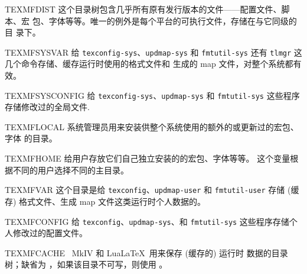 \documentclass{article}
\begin{document}
\begin{ttdescription}
\item [TEXMFDIST] 这个目录树包含几乎所有原有发行版本的文件——配置文件、脚本、宏
包、字体等等。唯一的例外是每个平台的可执行文件，存储在与它同级的  目
录下。
\item [TEXMFSYSVAR] 给 \verb+texconfig-sys+、\verb+updmap-sys+ 和
\verb+fmtutil-sys+ 还有 \verb+tlmgr+ 这几个命令存储、缓存运行时使用的格式文件和
生成的 map 文件，对整个系统都有效。
\item [TEXMFSYSCONFIG] 给 \verb+texconfig-sys+、\verb+updmap-sys+ 和
\verb+fmtutil-sys+ 这些程序存储修改过的全局文件.
\item [TEXMFLOCAL] 系统管理员用来安装供整个系统使用的额外的或更新过的宏包、字体
的目录。
\item [TEXMFHOME] 给用户存放它们自己独立安装的的宏包、字体等等。
这个变量根据不同的用户选择不同的主目录。
\item [TEXMFVAR] 这个目录是给 \verb+texconfig+、\verb+updmap-user+ 和
  \verb+fmtutil-user+ 存储 (缓存) 格式文件、生成 map 文件这类运行时个人数据的。
\item [TEXMFCONFIG] 给 \verb+texconfig+、\verb+updmap-sys+、和 \verb+fmtutil-sys+
这些程序存储个人修改过的配置文件。
\item [TEXMFCACHE] \ConTeXt\ MkIV 和 Lua\LaTeX\ 用来保存 (缓存的) 运行时
数据的目录树；缺省为 ，如果该目录不可写，则使用
。
\end{ttdescription}
\end{document}
